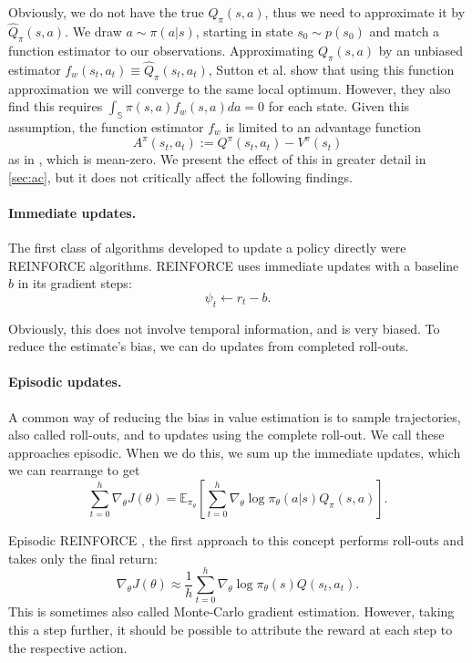 Obviously, we do not have the true $Q_\pi(s,a)$, thus we need to approximate it by $\hat{Q}_\pi(s,a)$. 
We draw $a \sim \pi(a|s)$, starting in state $s_0 \sim p(s_0)$ and match a function estimator to our observations.
Approximating $Q_\pi(s,a)$ by an unbiased estimator $f_w(s_t, a_t) \equiv \hat{Q}_\pi(s_t, a_t)$, Sutton et al. \cite{Sutton:1999:PGM:3009657.3009806} show that using this function approximation we will converge to the same local optimum.
However, they also find this requires $\int_\mathbb{S}{\pi(s,a)f_w(s,a)da} = 0$ for each state. 
Given this assumption, the function estimator $f_w$ is limited to an advantage function
\begin{equation}
	A^{\pi}(s_t, a_t) := Q^{\pi}(s_t, a_t) - V^{\pi}(s_t)
	\label{eqn:adv}
\end{equation}
as in \cite{1993b}, which is mean-zero. We present the effect of this in greater detail in \ref{sec:ac}, but it does not critically affect the following findings.

\paragraph{Immediate updates.} 
The first class of algorithms developed to update a policy directly were REINFORCE \cite{Williams92simplestatistical} algorithms.
REINFORCE uses immediate updates with a baseline $b$ in its gradient steps:
\begin{equation}
  \psi_t \leftarrow r_t-b.
\end{equation}

Obviously, this does not involve temporal information, and is very biased.
To reduce the estimate's bias, we can do updates from completed roll-outs.

\paragraph{Episodic updates.} 
A common way of reducing the bias in value estimation is to sample trajectories, also called roll-outs, and to updates using the complete roll-out. 
We call these approaches episodic. 
When we do this, we sum up the immediate updates, which we can rearrange to get
\begin{equation}
  \sum_{t=0}^h \nabla_\theta J(\theta) = \mathbb{E}_{\pi_\theta}\left[\sum_{t=0}^h \nabla_\theta{\log\pi_\theta(a|s)}Q_\pi(s,a)\right].
  \label{eqn:egrad}
\end{equation}

Episodic REINFORCE \cite{Williams92simplestatistical}, the first approach to this concept performs roll-outs and takes only the final return:
\begin{equation}
  \nabla_\theta J(\theta) \approx \frac{1}{h} \sum_{t=0}^h \nabla_\theta\log\pi_\theta(s) Q(s_t,a_t).
\end{equation}
This is sometimes also called Monte-Carlo gradient estimation. 
However, taking this a step further, it should be possible to attribute the reward at each step to the respective action. 

